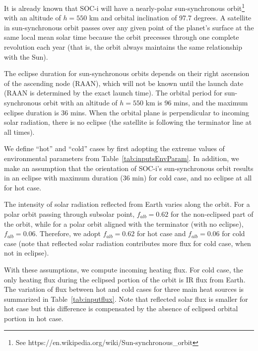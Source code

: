 \documentclass[]{aastex62}
\begin{document}
\vskip 0.1in 

It is already known that SOC-i will have a nearly-polar sun-synchronous 
orbit\footnote{See https://en.wikipedia.org/wiki/Sun-synchronous\_orbit} 
with an altitude of $h=550$ km and orbital inclination of 97.7 degrees. A satellite in sun-synchronous 
orbit passes over any given point of the planet's surface at the same local mean solar time because the 
orbit precesses through one complete revolution each year (that is, the orbit always maintains the same 
relationship with the Sun). 

The eclipse duration for sun-synchronous orbits depends on their right ascension of the 
ascending node (RAAN), which will not be known until the launch date (RAAN is determined
by the exact launch time). The orbital period for sun-synchronous orbit with an altitude of 
$h=550$ km is 96 mins, and the maximum eclipse duration is 36 mins.  When the orbital 
plane is perpendicular to incoming solar radiation, there is no eclipse (the satellite is following 
the terminator line at all times). 



\vskip 0.1in 

We define ``hot'' and ``cold'' cases by first adopting 
the extreme values of environmental parameters from Table~\ref{tab:inputsEnvParam}. 
In addition, we make an assumption that the orientation of SOC-i's sun-synchronous orbit
results in an eclipse with maximum duration (36 min) for cold case, and no eclipse at all for 
hot case. 

The intensity of solar radiation reflected from Earth varies along the orbit. For a polar 
orbit passing through subsolar point, $f_{alb}=0.62$ for the non-eclipsed part of the orbit, while 
for a polar orbit aligned with the terminator (with no eclipse), $f_{alb}=0.06$. Therefore, 
we adopt $f_{alb}=0.62$ for hot case and $f_{alb}=0.06$ for cold case (note that reflected solar 
radiation contributes more flux for cold case, when not in eclipse). 
 
With these assumptions, we compute incoming heating flux.
For cold case, the only heating flux during the eclipsed portion of the orbit is IR flux from Earth. 
The variation of flux between hot and cold cases for three main heat sources is summarized in 
Table~\ref{tab:inputflux}. Note that reflected solar flux is smaller for hot case but this difference
is compensated by the absence of eclipsed orbital portion in hot case. 
\end{document}
